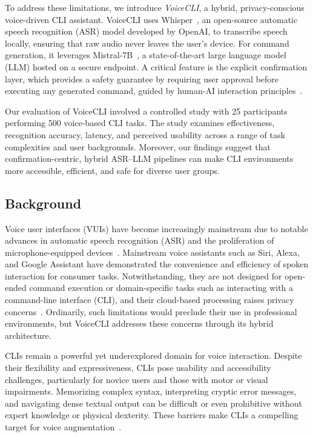 \documentclass[a4paper,12pt]{article}
\begin{document}
To address these limitations, we introduce \textit{VoiceCLI}, a hybrid, privacy-conscious voice-driven CLI assistant. VoiceCLI uses Whisper~\cite{ref10}, an open-source automatic speech recognition (ASR) model developed by OpenAI, to transcribe speech locally, ensuring that raw audio never leaves the user's device. For command generation, it leverages Mistral-7B~\cite{ref11}, a state-of-the-art large language model (LLM) hosted on a secure endpoint. A critical feature is the explicit confirmation layer, which provides a safety guarantee by requiring user approval before executing any generated command, guided by human-AI interaction principles~\cite{ref12}.

Our evaluation of VoiceCLI involved a controlled study with 25 participants performing 500 voice-based CLI tasks. The study examines effectiveness, recognition accuracy, latency, and perceived usability across a range of task complexities and user backgrounds. Moreover, our findings suggest that confirmation-centric, hybrid ASR–LLM pipelines can make CLI environments more accessible, efficient, and safe for diverse user groups.


\subsection{Background}

Voice user interfaces (VUIs) have become increasingly mainstream due to notable advances in automatic speech recognition (ASR) and the proliferation of microphone-equipped devices~\cite{ref7}. Mainstream voice assistants such as Siri, Alexa, and Google Assistant have demonstrated the convenience and efficiency of spoken interaction for consumer tasks. Notwithstanding, they are not designed for open-ended command execution or domain-specific tasks such as interacting with a command-line interface (CLI), and their cloud-based processing raises privacy concerns~\cite{ref8,ref9}. Ordinarily, such limitations would preclude their use in professional environments, but VoiceCLI addresses these concerns through its hybrid architecture.



CLIs remain a powerful yet underexplored domain for voice interaction. Despite their flexibility and expressiveness, CLIs pose usability and accessibility challenges, particularly for novice users and those with motor or visual impairments. Memorizing complex syntax, interpreting cryptic error messages, and navigating dense textual output can be difficult or even prohibitive without expert knowledge or physical dexterity. These barriers make CLIs a compelling target for voice augmentation~\cite{ref2,ref4}.
\end{document}
